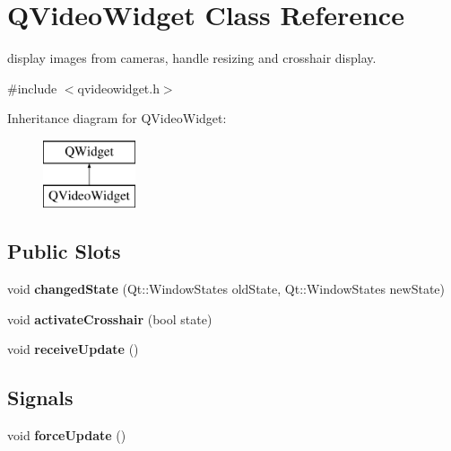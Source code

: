 \hypertarget{class_q_video_widget}{\section{Q\-Video\-Widget Class Reference}
\label{class_q_video_widget}
}


display images from cameras, handle resizing and crosshair display.  




{\ttfamily \#include $<$qvideowidget.\-h$>$}

Inheritance diagram for Q\-Video\-Widget\-:\begin{figure}[H]
\begin{center}
\leavevmode
\includegraphics[height=2.000000cm]{class_q_video_widget}
\end{center}
\end{figure}
\subsection*{Public Slots}
\begin{DoxyCompactItemize}
\item 
\hypertarget{class_q_video_widget_aa3be10b5a18667fe60b6da0deba33e2b}{void {\bfseries changed\-State} (Qt\-::\-Window\-States old\-State, Qt\-::\-Window\-States new\-State)}\label{class_q_video_widget_aa3be10b5a18667fe60b6da0deba33e2b}

\item 
\hypertarget{class_q_video_widget_a35f34cdbb0f92307698c02b2dc99c4bd}{void {\bfseries activate\-Crosshair} (bool state)}\label{class_q_video_widget_a35f34cdbb0f92307698c02b2dc99c4bd}

\item 
\hypertarget{class_q_video_widget_a12b2bc7e23dd56adff244520acf4d16c}{void {\bfseries receive\-Update} ()}\label{class_q_video_widget_a12b2bc7e23dd56adff244520acf4d16c}

\end{DoxyCompactItemize}
\subsection*{Signals}
\begin{DoxyCompactItemize}
\item 
\hypertarget{class_q_video_widget_a7669505f07e3d66ea9a0c1553c096ea2}{void {\bfseries force\-Update} ()}\label{class_q_video_widget_a7669505f07e3d66ea9a0c1553c096ea2}

\end{DoxyCompactItemize}

